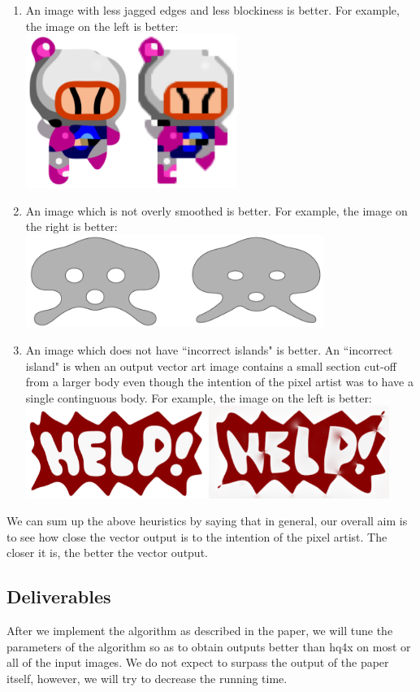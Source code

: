 \documentclass[a4paper,9pt]{article}
\begin{document}
\begin{enumerate}
  \itemsep-0.25em
  \item An image with less jagged edges and less blockiness is better. For example, the image on the left is better:\\
  \includegraphics[height=5cm]{jagged}
  \item An image which is not overly smoothed is better. For example, the image on the right is better:\\
  \includegraphics[height=3cm]{corner}
  \item An image which does not have ``incorrect islands" is better. An ``incorrect island" is when an output vector art image contains a small section cut-off from a larger body even though the intention of the pixel artist was to have a single continguous body. For example, the image on the left is better:\\
  \includegraphics[height=3cm]{islands}
\end{enumerate}

We can sum up the above heuristics by saying that in general, our overall aim is to see how close the vector output is to the intention of the pixel artist. The closer it is, the better the vector output.

\textcolor{myrust}{\section{Deliverables}}

After we implement the algorithm as described in the paper, we will tune the parameters of the algorithm so as to obtain outputs better than hq4x on most or all of the input images. We do not expect to surpass the output of the paper itself, however, we will try to decrease the running time.
\end{document}
